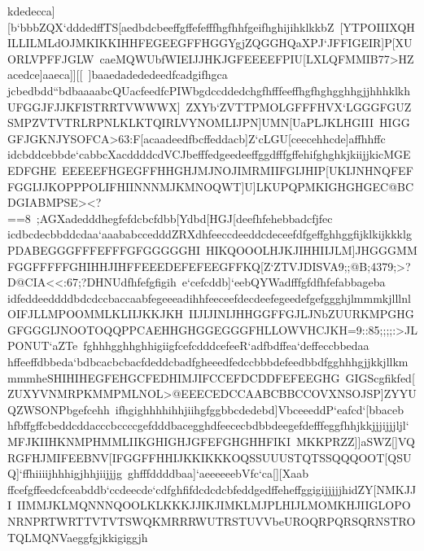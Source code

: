 {{ \hbox{kdedecca][b`bbbZQX`dddedffTS[aedbdcbeeffgffefefffhgfhhfgeifhghijihklkkbZ%
 [YTPOIIIXQHILLILMLdOJMKIKKIHHFEGEEGFFHGGYgjZQGGHQaXPJ`JFFIGEIR]P[XUORLVPFFJGLW%
 caeMQWUbfWIEIJJHKJGFEEEEFPIU[LXLQFMMIB77>HZacedce]aaeca]][[%
 ]baaedadededeedfcadgifhgca}
 \hbox{jcbedbdd``bdbaaaabcQUacfeedfcPIWbgdccddedchgfhfffeeffhgfhghgghhgjjhhhklkhUFGGJFJJKFISTRRTVWWWX]%
 ZXYb`ZVTTPMOLGFFFHVX`LGGGFGUZSMPZVTVTRLRPNLKLKTQIRLVYNOMLIJPN]UMN[UaPLJKLHGIII%
 HIGGGFJGKNJYSOFCA>63:F[acaadeedfbcffeddacb]Z`cLGU[ceecehhcde]affhhffc%
 }
 \hbox{idcbddcebbde`cabbcXacddddcdVCJbefffedgeedeeffggdfffgffehifghghkjkiijjkicMGEEDFGHE%
 EEEEEFHGEGFFHHGHJMJNOJIMRMIIFGIJHIP[UKIJNHNQFEFFGGIJJKOPPPOLIFHIINNNMJKMNOQWT]U]LKUPQPMKIGHGHGEC@BCDGIABMPSE><?==8%
 ;AGXadedddhegfefdcbcfdbb[Ydbd[HGJ[deefhfehebbadcfjfec}
 \hbox{icdbcdecbbddcdaa`aaababccedddZRXdhfeeccdeeddcdeceefdfgeffghhggfijklkijkkklgPDABEGGGFFFEFFFGFGGGGGHI%
 HIKQOOOLHJKJIHHIIJLM]JHGGGMMFGGFFFFFGHIHHJIHFFEEEDEFEFEEGFFKQ[Z`ZTVJDISVA9;;@B;4379;>?D@CIA<<:67;?DHNUdfhfefgfigih%
 e`cefcddb]`eebQYWadfffgfdfhfefabbageba}
 \hbox{idfeddeeddddbdcdccbaccaabfegeeeadihhfeeceefdecdeefegeedefgefggghjlmmmkjlllnlOIFJLLMPOOMMLKLIIJKKJKH%
 IIJIJINIJHHGGFFGJLJNbZUURKMPGHGGFGGGIJNOOTOQQPPCAEHHGHGGEGGGFHLLOWVHCJKH=9::85;;;;:>JLPONUT`aZTe%
 fghhhgghhghhigiigfcefcdddcefeeR`adfbdffea`deffeccbbedaa}
 \hbox{hffeeffdbbeda`bdbcacbcbacfdeddcbadfgheeedfedccbbbdefeedbbdfgghhhgjjkkjllkmmmmheSHIHIHEGFEHGCFEDHIMJIFCCEFDCDDFEFEEGHG%
 GIGScgfikfed[ZUXYVNMRPKMMPMLNOL>@EEECEDCCAABCBBCCOVXNSOJSP]ZYYUQZWSONPbgefcehh%
 ifhgighhhhihhjiihgfggbbcdedebd]VbceeeddP`eafcd`[bbaceb}
 \hbox{hfbffgffcbeddcddacccbccccgefdddbacegghdfeececbdbbdeegefdefffeggfhhjkkjjjijjjljl`MFJKIIHKNMPHMMLIIKGHIGHJGFEFGHGHHFIKI%
 MKKPRZZ]]aSWZ[]VQRGFHJMIFEEBNV[IFGGFFHHIJKKIKKKOQSSUUUSTQTSSQQQOOT[QSUQ]`ffhiiiijhhhigjhhjiijjjg%
 ghfffddddbaa]`aeeeeeebVfc`ca[][Xaab}
 \hbox{ffcefgffeedcfceabddb`ccdeecde`cdfghfifdcdcdcbfeddgedffeheffggigijjjjjhidZY[NMKJJI%
 IIMMJKLMQNNNQOOLKLKKKJJIKJIMKLMJPLHIJLMOMKHJIIGLOPONRNPRTWRTTVTVTSWQKMRRRWUTRSTUVVbeUROQRPQRSQRNSTROTQLMQNVaeggfgjkkigiggjh%
}}}

